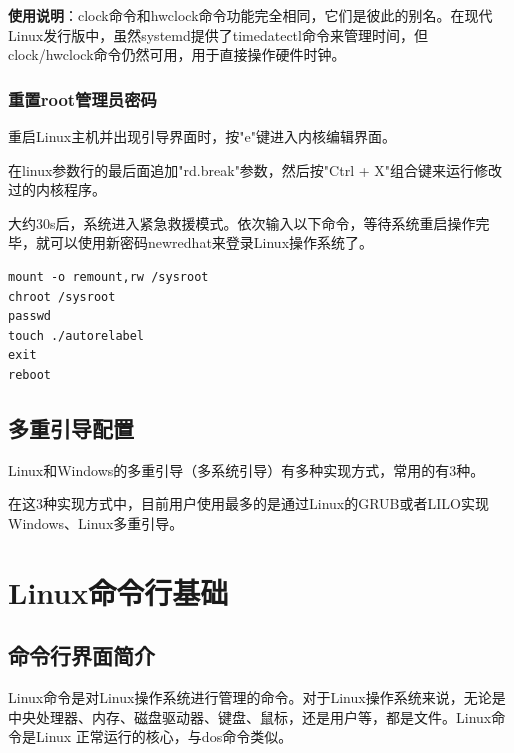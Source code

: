 \documentclass[12pt,UTF8]{ctexbook}
\begin{document}
\textbf{使用说明}：clock命令和hwclock命令功能完全相同，它们是彼此的别名。在现代Linux发行版中，虽然systemd提供了timedatectl命令来管理时间，但clock/hwclock命令仍然可用，用于直接操作硬件时钟。

\subsection{重置root管理员密码}
重启Linux主机并出现引导界面时，按"e"键进入内核编辑界面。

在linux参数行的最后面追加"rd.break"参数，然后按"Ctrl + X"组合键来运行修改过的内核程序。

大约30s后，系统进入紧急救援模式。依次输入以下命令，等待系统重启操作完毕，就可以使用新密码newredhat来登录Linux操作系统了。

\begin{verbatim}
mount -o remount,rw /sysroot
chroot /sysroot
passwd
touch ./autorelabel
exit
reboot
\end{verbatim}

\section{多重引导配置}
Linux和Windows的多重引导（多系统引导）有多种实现方式，常用的有3种。

在这3种实现方式中，目前用户使用最多的是通过Linux的GRUB或者LILO实现Windows、Linux多重引导。

\chapter{Linux命令行基础}

\section{命令行界面简介}
Linux命令是对Linux操作系统进行管理的命令。对于Linux操作系统来说，无论是中央处理器、内存、磁盘驱动器、键盘、鼠标，还是用户等，都是文件。Linux命令是Linux 正常运行的核心，与dos命令类似。
\end{document}
